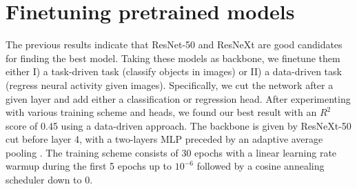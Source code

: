 \documentclass[10pt,conference,compsocconf]{IEEEtran}
\begin{document}
\section{Finetuning pretrained models}
The previous results indicate that ResNet-50 and ResNeXt are good candidates for finding the best model. Taking these models as backbone, we finetune them either I) a task-driven task (classify objects in images) or II) a data-driven task (regress neural activity given images). Specifically, we cut the network after a given layer and add either a classification or regression head. After experimenting with various training scheme and heads, we found our best result with an \(R^2\) score of 0.45 using a data-driven approach. The backbone is given by ResNeXt-50 cut before layer 4, with a two-layers MLP preceded by an adaptive average pooling \cite{AdaptiveAvgPool}. The training scheme consists of 30 epochs with a linear learning rate warmup during the first 5 epochs up to \(10^{-6}\) followed by a cosine annealing scheduler down to 0.

\newpage


\end{document}
